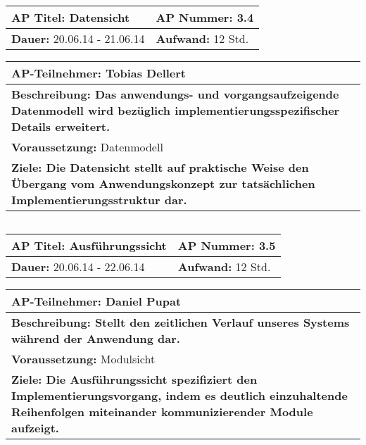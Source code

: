 \begin{tabular}{|p{7.43cm}|p{7.43cm}|}
\hline
\textbf{AP Titel: }Datensicht & \textbf{AP Nummer: }3.4\\ 
\hline
\textbf{Dauer: }20.06.14 - 21.06.14& \textbf{Aufwand: }12 Std.\\
\hline
\end{tabular}
\begin{tabular}{|p{15.3cm}|}
\hline
\textbf{AP-Teilnehmer: }Tobias Dellert\\
\hline
\textbf{Beschreibung: Das anwendungs- und vorgangsaufzeigende Datenmodell wird bezüglich implementierungsspezifischer Details erweitert. }\\
\hline
\textbf{Voraussetzung: }Datenmodell\\
\hline 
\textbf{Ziele: Die Datensicht stellt auf praktische Weise den Übergang vom Anwendungskonzept zur tatsächlichen Implementierungsstruktur dar.}\\
\hline 
\end{tabular}
\begin{verbatim}

\end{verbatim}

\begin{tabular}{|p{7.43cm}|p{7.43cm}|}
\hline
\textbf{AP Titel: }Ausführungssicht & \textbf{AP Nummer: }3.5\\ 
\hline
\textbf{Dauer: }20.06.14 - 22.06.14& \textbf{Aufwand: }12 Std.\\
\hline
\end{tabular}
\begin{tabular}{|p{15.3cm}|}
\hline
\textbf{AP-Teilnehmer: }Daniel Pupat \\
\hline
\textbf{Beschreibung: Stellt den zeitlichen Verlauf unseres Systems während der Anwendung dar.}\\
\hline
\textbf{Voraussetzung: }Modulsicht\\
\hline 
\textbf{Ziele: Die Ausführungssicht spezifiziert den Implementierungsvorgang, indem es deutlich einzuhaltende Reihenfolgen miteinander kommunizierender Module aufzeigt.}\\
\hline 
\end{tabular}
\begin{verbatim}

\end{verbatim}

